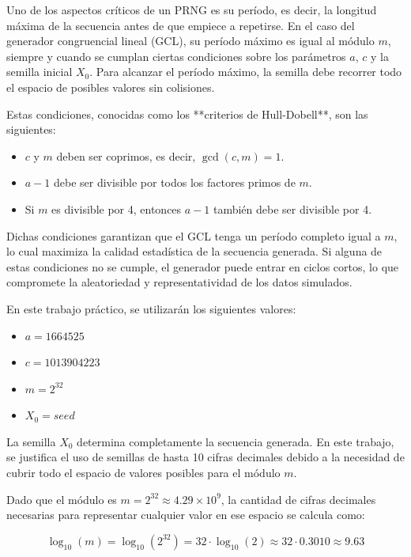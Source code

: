 \documentclass{article}
\begin{document}
Uno de los aspectos críticos de un PRNG es su período, es decir, la longitud máxima de la secuencia antes de que empiece a repetirse. En el caso del generador congruencial lineal (GCL), su período máximo es igual al módulo \( m \), siempre y cuando se cumplan ciertas condiciones sobre los parámetros \( a \), \( c \) y la semilla inicial \( X_0 \). Para alcanzar el período máximo, la semilla debe recorrer todo el espacio de posibles valores sin colisiones.

Estas condiciones, conocidas como los **criterios de Hull-Dobell**, son las siguientes:

\begin{itemize}
    \item \( c \) y \( m \) deben ser coprimos, es decir, \( \gcd(c, m) = 1 \).
    \item \( a - 1 \) debe ser divisible por todos los factores primos de \( m \).
    \item Si \( m \) es divisible por 4, entonces \( a - 1 \) también debe ser divisible por 4.
\end{itemize}

Dichas condiciones garantizan que el GCL tenga un período completo igual a \( m \), lo cual maximiza la calidad estadística de la secuencia generada. Si alguna de estas condiciones no se cumple, el generador puede entrar en ciclos cortos, lo que compromete la aleatoriedad y representatividad de los datos simulados.

En este trabajo práctico, se utilizarán los siguientes valores:
\begin{itemize}
    \item $a = 1664525$
    \item $c = 1013904223$
    \item $m = 2^{32}$
    \item $X_0 = seed$
\end{itemize}

La semilla $X_0$ determina completamente la secuencia generada. En este trabajo, se justifica el uso de semillas de hasta 10 cifras decimales debido a la necesidad de cubrir todo el espacio de valores posibles para el módulo $m$.

Dado que el módulo es $m = 2^{32} \approx 4.29 \times 10^9$, la cantidad de cifras decimales necesarias para representar cualquier valor en ese espacio se calcula como:

\begin{equation}
    \log_{10}(m) = \log_{10}(2^{32}) = 32 \cdot \log_{10}(2) \approx 32 \cdot 0.3010 \approx 9.63
\end{equation}
\end{document}
